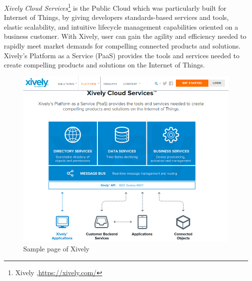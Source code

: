     \emph{Xively Cloud Services}\footnote{Xively ,\url{https://xively.com/}} is the Public Cloud which was particularly built for Internet of Things, by giving developers standards-based services and tools, elastic scalability, and intuitive lifecycle management capabilities oriented on a business customer. With Xively, user can gain the agility and efficiency needed to rapidly meet market demands for compelling connected products and solutions. Xively's Platform as a Service (PaaS) provides the tools and services needed to create compelling products and solutions on the Internet of Things.
    \begin{figure}[!ht]
		\centering
		\includegraphics[scale=0.5]{Material/examples/Xively.png}   
		\caption[Sample page of Xively]{Sample page of Xively}                  
		\end{figure} 

